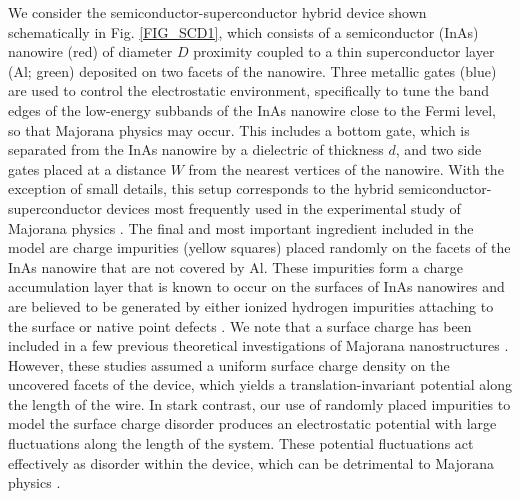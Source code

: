 \documentclass[aps,prmaterials,twocolumn,superscriptaddress,longbibliography]{revtex4-2}
\begin{document}
We consider the semiconductor-superconductor hybrid device shown schematically in Fig. \ref{FIG_SCD1}, which consists of a semiconductor (InAs) nanowire (red) of diameter $D$ proximity coupled to a thin superconductor layer (Al; green) deposited on two facets of the nanowire. Three metallic gates (blue) are used to control the electrostatic environment, specifically to tune the band edges of the low-energy subbands of the InAs nanowire close to the Fermi level, so that Majorana physics may occur. This includes a bottom gate, which is separated from the InAs nanowire by a dielectric of thickness $d$, and two side gates placed at a distance $W$ from the nearest vertices of the nanowire. With the exception of small details, this setup corresponds to the hybrid semiconductor-superconductor devices most frequently used in the experimental study of Majorana physics \cite{mourik2012signatures,deng2012anomalous,das2012zerobias,chang2015hard,albrecht2016exponential,chen2017experimental,moor2018electric,lee2019selectivearea,bommer2019spinorbit,shen2021full,yu2021nonmajorana}. The final and most important ingredient included in the model are charge impurities (yellow squares) placed randomly on the facets of the InAs nanowire that are not covered by Al. These impurities form a charge accumulation layer that is known to occur on the surfaces of InAs nanowires \cite{olsson1996charge} and are believed to be generated by either ionized hydrogen impurities attaching to the surface or native point defects \cite{weber2010intrinsic,castleton2013hydrogen}. We note that a surface charge has been included in a few previous theoretical investigations of Majorana nanostructures \cite{winkler2019unified,escribano2019effects,woods2020subband,liu2021electronic}. However, these studies assumed a uniform surface charge density on the uncovered facets of the device, which yields a translation-invariant potential along the length of the wire. In stark contrast, our use of randomly placed impurities to model the surface charge disorder produces an electrostatic potential with large fluctuations along the length of the system. These potential fluctuations act effectively as disorder within the device, which can be detrimental to Majorana physics \cite{stanescu2011majorana,bagrets2012class,liu2012zerobias,lutchyn2012momentum,rainis2013realistic,sau2013density,degottardi2013majorana,adagideli2014effects,cole2016proximity,woods2019zeroenergy,pan2020physical,woods2021charge,pan2021crossover,dassarma2021disorderinduced,zeng2021partiallyseparated}. 
\end{document}
